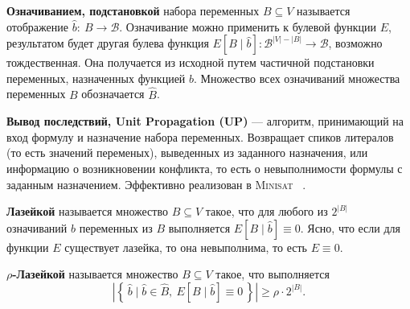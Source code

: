 \begin{definition}\label{overview:assumption}
    \textbf{Означиванием, подстановкой} набора переменных $B \subseteq V$ называется отображение
    $\hat{b}\colon~ B \to \mathcal{B}$. Означивание можно применить к булевой функции $E$,
    результатом будет другая булева функция $E[B \mid \hat{b}] \colon \mathcal{B}^{|V| - |B|} \to
    \mathcal{B}$, возможно тождественная. Она получается из исходной путем частичной подстановки
    переменных, назначенных функцией $\hat{b}$. Множество всех означиваний множества переменных
    $B$ обозначается $\hat{B}$.
\end{definition}

\begin{definition}\label{overview:prop}
    \textbf{Вывод последствий, Unit Propagation (UP)} --- алгоритм, принимающий на вход формулу
    и назначение набора переменных. Возвращает спиков литералов (то есть значений переменых),
    выведенных из заданного назначения, или информацию о возникновении конфликта, то есть о
    невыполнимости формулы с заданным назначением. Эффективно реализован в \textsc{Minisat}~
    \cite{bib:minisat}.
\end{definition}

\begin{definition}\label{overview:backdoor}
    \textbf{Лазейкой} называется множество $B \subseteq V$ такое, что для любого из $2^{|B|}$
    означиваний $\hat{b}$ переменных из $B$ выполняется $E[B \mid \hat{b}] \equiv 0$.
    Ясно, что если для функции $E$ существует лазейка, то она невыполнима, то есть $E \equiv 0$.
\end{definition}

\begin{definition}\label{overview:rho-backdoor}
    \textbf{$\rho$-Лазейкой} называется множество $B \subseteq V$ такое, что выполняется
\[
    \left|\left\{\, \hat{b} \mid \hat{b} \in \hat{B},~ E[B \mid \hat{b}] \equiv 0 \,\right\}\right|
    \geqslant \rho \cdot 2^{|B|}.
\]
\end{definition}

\newcommand*{\prob}{\mathsf{Pr}}


